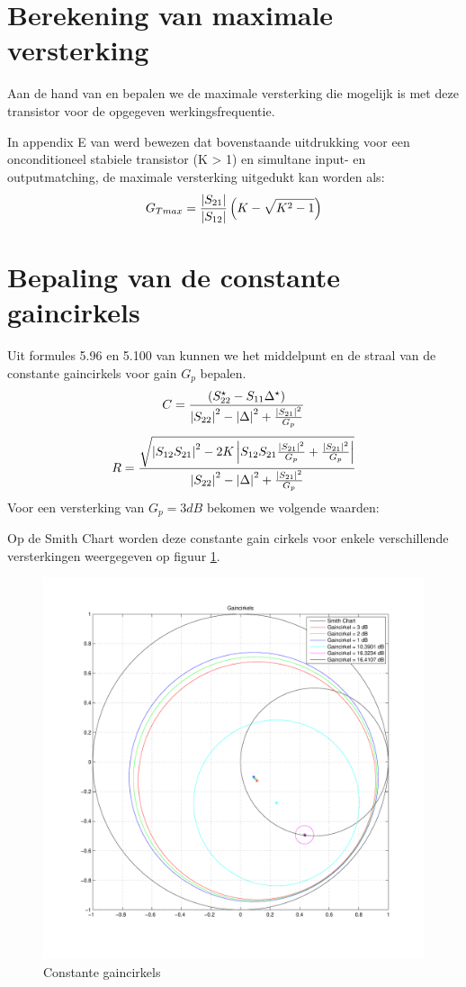   

\section{Berekening van maximale versterking}
  Aan de hand van \cite{Pozar} en \cite{Gonzalez} bepalen we de maximale versterking die mogelijk is met deze transistor voor
  de opgegeven werkingsfrequentie.
  
  In appendix E van \cite{Gonzalez} werd bewezen dat bovenstaande uitdrukking voor een onconditioneel stabiele transistor (K > 1)
  en simultane input- en outputmatching, de maximale versterking uitgedukt kan worden als:
  \[
    G_{Tmax} = \frac{\left| S_{21} \right|}{\left| S_{12} \right|} \left( K - \sqrt{K^2-1}\right)
  \]
  
  
  \section{Bepaling van de constante gaincirkels}
  Uit formules 5.96 en 5.100 van \cite{lessen} kunnen we het middelpunt en de straal van de constante gaincirkels voor gain $G_p$ bepalen.
  \[
    C = \frac{\left( S_{22}^{\star} - S_{11} \Delta^{\star} \right)}{\left| S_{22} \right|^2 - \left| \Delta \right|^2 + \frac{\left| S_{21} \right|^ 2}{G_p}}
  \]
  \[
    R = \frac{\sqrt{\left| S_{12} S_{21} \right|^2 - 2 K \left| S_{12} S_{21} \frac{\left| S_{21} \right|^2}{G_p} + \frac{\left| S_{21} \right|^2}{G_p}  \right|}}{\left| S_{22} \right|^2 - \left| \Delta \right|^2 + \frac{\left| S_{21} \right|^2}{G_p}}
  \]
  Voor een versterking van $G_p = 3dB$ bekomen we volgende waarden:
  
  Op de Smith Chart worden deze constante gain cirkels voor enkele verschillende versterkingen weergegeven op figuur \ref{fig:gainCirkels}.
  \begin{figure}[!h]
      \centering
      \includegraphics[width=\textwidth,keepaspectratio=true]{fig/gaincirkels.pdf}  
      \caption{Constante gaincirkels} 
      \label{fig:gainCirkels}
    \end{figure}
  

